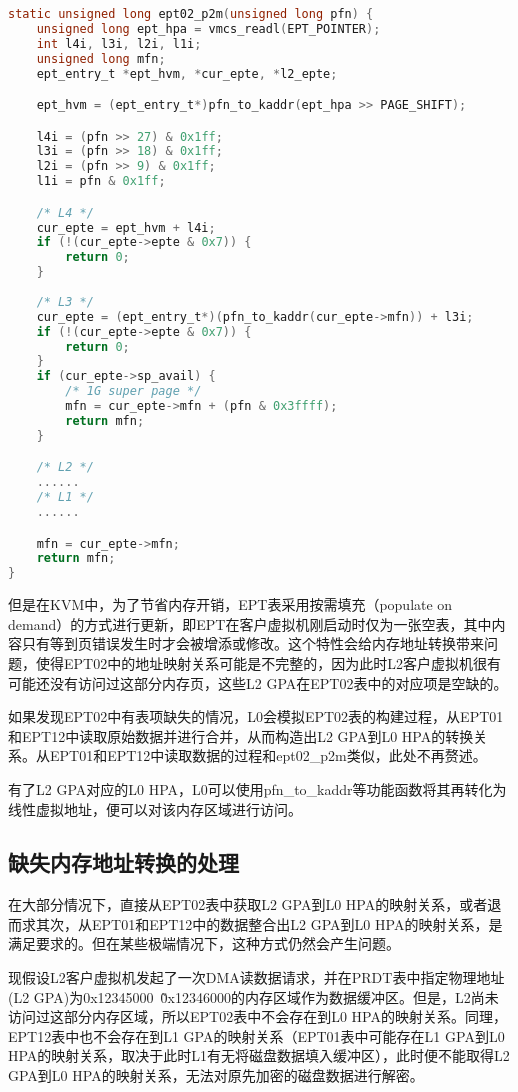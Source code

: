 \begin{lstlisting}[language={C}, caption={ept02\_p2m实现源代码}]
static unsigned long ept02_p2m(unsigned long pfn) {
    unsigned long ept_hpa = vmcs_readl(EPT_POINTER);
    int l4i, l3i, l2i, l1i;
    unsigned long mfn;
    ept_entry_t *ept_hvm, *cur_epte, *l2_epte;

    ept_hvm = (ept_entry_t*)pfn_to_kaddr(ept_hpa >> PAGE_SHIFT);

    l4i = (pfn >> 27) & 0x1ff;
    l3i = (pfn >> 18) & 0x1ff;
    l2i = (pfn >> 9) & 0x1ff;
    l1i = pfn & 0x1ff;

    /* L4 */
    cur_epte = ept_hvm + l4i;
    if (!(cur_epte->epte & 0x7)) {
        return 0;
    }
    
    /* L3 */
    cur_epte = (ept_entry_t*)(pfn_to_kaddr(cur_epte->mfn)) + l3i;
    if (!(cur_epte->epte & 0x7)) {
        return 0;
    }
    if (cur_epte->sp_avail) {
    	/* 1G super page */
        mfn = cur_epte->mfn + (pfn & 0x3ffff);
        return mfn;
    }

    /* L2 */
    ......
    /* L1 */
    ......

    mfn = cur_epte->mfn;
    return mfn;
}
\end{lstlisting}

但是在KVM中，为了节省内存开销，EPT表采用按需填充（populate on demand）的方式进行更新，即EPT在客户虚拟机刚启动时仅为一张空表，其中内容只有等到页错误发生时才会被增添或修改。这个特性会给内存地址转换带来问题，使得EPT02中的地址映射关系可能是不完整的，因为此时L2客户虚拟机很有可能还没有访问过这部分内存页，这些L2 GPA在EPT02表中的对应项是空缺的。

如果发现EPT02中有表项缺失的情况，L0会模拟EPT02表的构建过程，从EPT01和EPT12中读取原始数据并进行合并，从而构造出L2 GPA到L0 HPA的转换关系。从EPT01和EPT12中读取数据的过程和ept02\_p2m类似，此处不再赘述。

有了L2 GPA对应的L0 HPA，L0可以使用pfn\_to\_kaddr等功能函数将其再转化为线性虚拟地址，便可以对该内存区域进行访问。

\subsection{缺失内存地址转换的处理}

在大部分情况下，直接从EPT02表中获取L2 GPA到L0 HPA的映射关系，或者退而求其次，从EPT01和EPT12中的数据整合出L2 GPA到L0 HPA的映射关系，是满足要求的。但在某些极端情况下，这种方式仍然会产生问题。

现假设L2客户虚拟机发起了一次DMA读数据请求，并在PRDT表中指定物理地址(L2 GPA)为0x12345000~\~0x12346000的内存区域作为数据缓冲区。但是，L2尚未访问过这部分内存区域，所以EPT02表中不会存在到L0 HPA的映射关系。同理，EPT12表中也不会存在到L1 GPA的映射关系（EPT01表中可能存在L1 GPA到L0 HPA的映射关系，取决于此时L1有无将磁盘数据填入缓冲区），此时便不能取得L2 GPA到L0 HPA的映射关系，无法对原先加密的磁盘数据进行解密。


